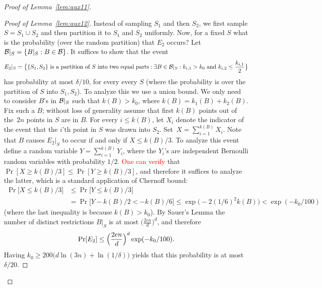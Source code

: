 \documentclass{article}
\newcommand{\B}{{\cal B}}
\newcommand{\samp}{S}
\newcommand{\new}[1]{\textcolor{red}{#1}}
\newcommand{\comment}[3]{\marginpar{\textcolor{#2}{#1: #3}}}
\newcommand{\shay}[1]{\comment{Shay}{red}{#1}}
\begin{document}
\begin{proof}[Proof of Lemma~\ref{lem:aux11}]
\begin{proof}[Proof of Lemma~\ref{lem:aux12}]
Instead of sampling $\samp_1$ and then $\samp_2$,
we first sample $\samp=\samp_1\cup \samp_2$ and 
then partition it to $\samp_1$ and $\samp_2$ uniformly.
Now, for a fixed $\samp$ what is the probability (over the random partition)
that $E_2$ occurs?
Let $\B|_{\samp} = \{B|_{\samp} : B\in\B\}$.
It suffices to show that the event
\[E_2|_{\samp} = 
\bigl\{ \{S_1,S_2\}\text{ is a partition of $S$ into two equal parts} :
\exists {B\in\B|_{\samp}}:
  k_{i,1}>k_0 \mbox{ and } k_{i,2} \leq \frac{k_{i,1}}{2}
  \bigr\}
\]
has probability at most $\delta/10$, for every every $\samp$ 
(where the probability is over the partition of $\samp$ into $\samp_1,\samp_2$).
To analyze this we use a union bound. 
We only need to consider $B$'s in $\B|_{\samp}$ such that $k(B) > k_0$,
where $k(B) = k_{1}(B)+ k_{2}(B)$.
Fix such a $B$;
without loss of generality assume that
first $k(B)$ points out of the~$2n$
points in $S$ are in $B$. 
For every $i\leq k(B)$,
let $X_i$ denote the indicator of the event
that the $i$'th point in $S$ was drawn into $S_2$.
Set~$X=\sum_{i=1}^{k(B)}X_i$.
Note that $B$ causes $E_2|_{\samp}$ to occur if and only if $X\leq k(B)/3$.
To analyze this event define a random variable $Y=\sum_{i=1}^{k(B)}Y_i$,
where the $Y_i$'s are independent Bernoulli random variables with probability $1/2$.
\new{One can verify} that $\Pr[X\geq k(B)/3]\leq \Pr[Y\geq k(B)/3]$,
and therefore it suffices to analyze the latter, 
which is a standard application of Chernoff bound:
\shay{Here we should refer to the statement that sampling without repetitions is more concentrated.}
\begin{align*}
\Pr\bigl[X\leq k(B)/3\bigr]&\leq 
\Pr\bigl[Y\leq k(B)/3\bigr]\\
&=\Pr\bigl[Y- k(B)/2 < -k(B)/6\bigr]\leq
\exp\bigl(-2(1/6)^2k(B)\bigr) < \exp(-k_0/100)
\end{align*}
(where the last inequality is because $k(B) > k_0$).
By Sauer's Lemma
the number of distinct restrictions $B|_S$ is at most $\bigl(\frac{2en}{d}\bigr)^d$, and therefore 
\[\Pr[E_2]\leq \Bigl(\frac{2en}{d}\Bigr)^d\exp(-k_0/100).\]
Having $k_0\geq 200\bigl(d\ln(3n) + \ln(1/\delta) \bigr)$ yields
that this probability is at most $\delta/20$.
\end{proof}


\end{proof}
\end{document}
